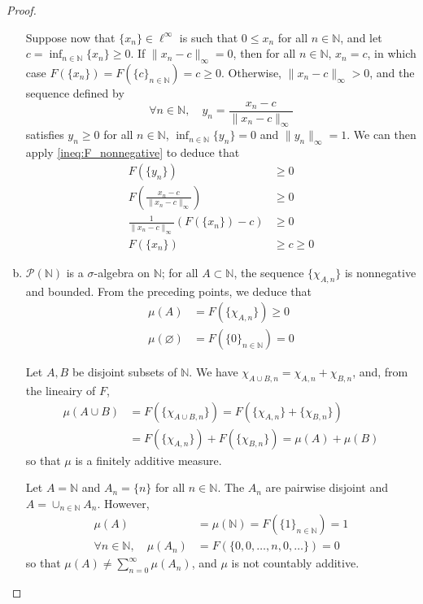 \documentclass[11pt,a4paper,twoside]{article}
\theoremstyle{definition}
\theoremstyle{plain}
\begin{document}
\begin{proof}
\begin{enumerate}[(a)]
    Suppose now that $\{ x_n \} \in \ell^\infty$ is such that $0 \leq x_n$ for all $n \in \mathbb{N}$, and let $c = \inf_{n \in \mathbb{N}} \{ x_n \} \geq 0$.
    If $\| x_n - c \|_\infty = 0$, then for all $n \in \mathbb{N}$, $x_n = c$, in which case $F ( \{ x_n \} ) = F ( \{ c \}_{n \in \mathbb{N}} ) = c \geq 0$.
    Otherwise, $\| x_n - c \|_\infty > 0$, and the sequence defined by
    \begin{equation*}
      \forall n \in \mathbb{N}, \quad y_n = \frac{x_n - c}{\| x_n - c \|_\infty}
    \end{equation*}
    satisfies $y_n \geq 0$ for all $n \in \mathbb{N}$, $\inf_{n \in \mathbb{N}} \{ y_n \} = 0$ and $\| y_n \|_\infty = 1$.
    We can then apply \eqref{ineq:F_nonnegative} to deduce that
    \begin{align*}
      F ( \{ y_n \} ) &\geq 0 \\
      F \left( \frac{x_n - c}{\| x_n - c \|_\infty} \right) &\geq 0 \\
      \frac{1}{\| x_n - c \|_\infty} \left( F \left( \{ x_n \} \right) - c \right) &\geq 0 \\
      F \left( \{ x_n \} \right) &\geq c \geq 0
    \end{align*}

  \item $\mathscr{P} ( \mathbb{N} )$ is a $\sigma$-algebra on $\mathbb{N}$; for all $A \subset \mathbb{N}$, the sequence
    $\{ \chi_{A, n} \}$ is nonnegative and bounded. From the preceding points, we deduce that
    \begin{align*}
      \mu ( A ) &= F ( \{ \chi_{A, n} \} ) \geq 0 \\
      \mu ( \varnothing ) &= F ( \{ 0 \}_{n \in \mathbb{N}} ) = 0
    \end{align*}

    Let $A, B$ be disjoint subsets of $\mathbb{N}$. We have $\chi_{A \cup B, n} = \chi_{A, n} + \chi_{B, n}$, and, from the lineairy of $F$,
    \begin{align*}
      \mu ( A \cup B ) &= F ( \{ \chi_{A \cup B, n} \} ) = F ( \{ \chi_{A, n} \} + \{ \chi_{B, n} \}) \\
      &= F ( \{ \chi_{A, n} \} ) + F ( \{ \chi_{B, n} \} ) = \mu ( A ) + \mu ( B )
    \end{align*}
    so that $\mu$ is a finitely additive measure.

    Let $A = \mathbb{N}$ and $A_n = \{ n \}$ for all $n \in \mathbb{N}$. The $A_n$ are pairwise disjoint and
    $A = \cup_{n \in \mathbb{N}} A_n$. However,
    \begin{align*}
      \mu ( A ) &= \mu ( \mathbb{N} ) = F ( \{ 1 \}_{n \in \mathbb{N}} ) = 1 \\
      \forall n \in \mathbb{N}, \quad \mu ( A_n ) &= F ( \{ 0, 0, \dotsc, n, 0, \dotsc \} ) = 0
    \end{align*}
    so that $\mu ( A ) \neq \sum_{n = 0}^\infty \mu ( A_n )$, and $\mu$ is not countably additive.

  \end{enumerate}

\end{proof}
\end{document}

